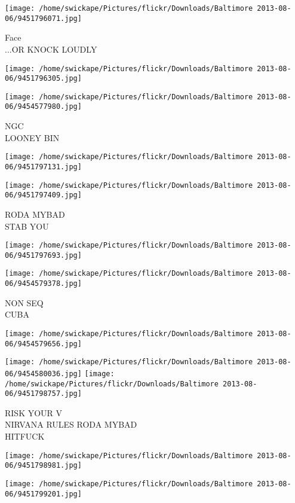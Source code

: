 \documentclass[10pt,letterpaper]{article}
\begin{document}
\vspace{0.25in}
\texttt{[image: /home/swickape/Pictures/flickr/Downloads/Baltimore 2013-08-06/9451796071.jpg]}

Face\\
...OR KNOCK LOUDLY
\pagebreak

\texttt{[image: /home/swickape/Pictures/flickr/Downloads/Baltimore 2013-08-06/9451796305.jpg]}

\vspace{0.25in}
\texttt{[image: /home/swickape/Pictures/flickr/Downloads/Baltimore 2013-08-06/9454577980.jpg]}

NGC\\
LOONEY BIN
\pagebreak

\texttt{[image: /home/swickape/Pictures/flickr/Downloads/Baltimore 2013-08-06/9451797131.jpg]}

\vspace{0.25in}
\texttt{[image: /home/swickape/Pictures/flickr/Downloads/Baltimore 2013-08-06/9451797409.jpg]}

RODA MYBAD\\
STAB YOU
\pagebreak

\texttt{[image: /home/swickape/Pictures/flickr/Downloads/Baltimore 2013-08-06/9451797693.jpg]}

\vspace{0.25in}
\texttt{[image: /home/swickape/Pictures/flickr/Downloads/Baltimore 2013-08-06/9454579378.jpg]}

NON SEQ\\
CUBA
\pagebreak

\texttt{[image: /home/swickape/Pictures/flickr/Downloads/Baltimore 2013-08-06/9454579656.jpg]}

\vspace{0.25in}
\texttt{[image: /home/swickape/Pictures/flickr/Downloads/Baltimore 2013-08-06/9454580036.jpg]}
\texttt{[image: /home/swickape/Pictures/flickr/Downloads/Baltimore 2013-08-06/9451798757.jpg]}

RISK YOUR V\\
NIRVANA RULES RODA MYBAD\\
HITFUCK
\pagebreak

\texttt{[image: /home/swickape/Pictures/flickr/Downloads/Baltimore 2013-08-06/9451798981.jpg]}

\vspace{0.25in}
\texttt{[image: /home/swickape/Pictures/flickr/Downloads/Baltimore 2013-08-06/9451799201.jpg]}
\end{document}
